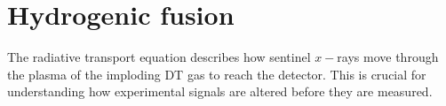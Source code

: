 \section{\label{sec:hydrogenic fusion}Hydrogenic fusion}

The radiative transport equation describes how sentinel $x-$rays move through the plasma of the imploding DT gas to reach the detector. This is crucial for understanding how experimental signals are altered before they are measured.

%
%

\endinput %